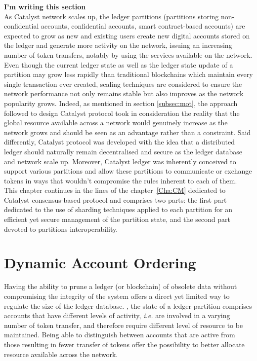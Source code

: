 \textbf{I'm writing this section}\\


As Catalyst network scales up, the ledger partitions (partitions storing non-confidential accounts, confidential accounts, smart contract-based accounts) are expected to grow as new and existing users create new digital accounts stored on the ledger and generate more activity on the network, issuing an increasing number of token transfers, notably by using the services available on the network. Even though the current ledger state as well as the ledger state update of a partition may grow less rapidly than traditional blockchains which maintain every single transaction ever created, scaling techniques are considered to ensure the network performance not only remains stable but also improves as the network popularity grows. Indeed, as mentioned in section \ref{subsec:mot}, the approach followed to design Catalyst protocol took in consideration the reality that the global resource available across a network would genuinely increase as the network grows and should be seen as an advantage rather than a constraint. Said differently, Catalyst protocol was developed with the idea that a distributed ledger should naturally remain decentralised and secure as the ledger database and network scale up. Moreover, Catalyst ledger was inherently conceived to support various partitions and allow these partitions to communicate or exchange tokens in ways that wouldn't compromise the rules inherent to each of them. \\

This chapter continues in the lines of the chapter~\ref{Cha:CM} dedicated to Catalyst consensus-based protocol and comprises two parts: the first part dedicated to the use of sharding techniques applied to each partition for an efficient yet secure management of the partition state, and the second part devoted to partitions interoperability. %

\section{Dynamic Account Ordering}
Having the ability to prune a ledger (or blockchain) of obsolete data without compromising the integrity of the system offers a direct yet limited way to regulate the size of the ledger database.  , the state of a ledger partition comprises accounts that have different levels of activity, \textit{i.e.} are involved in a varying number of token transfer, and therefore require different level of resource to be maintained. Being able to distinguish between accounts that are active from those resulting in fewer transfer of tokens offer the possibility to better allocate resource available across the network. \\

